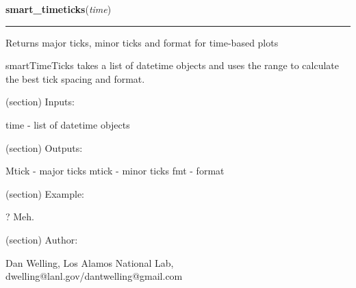     \label{spacepy:toolbox:smartTimeTicks}

    \vspace{0.5ex}

\hspace{.8\funcindent}\begin{boxedminipage}{\funcwidth}

    \raggedright \textbf{smart\_timeticks}(\textit{time})

    \vspace{-1.5ex}

    \rule{\textwidth}{0.5\fboxrule}
\setlength{\parskip}{2ex}
    Returns major ticks, minor ticks and format for time-based plots

    smartTimeTicks takes a list of datetime objects and uses the range to 
    calculate the best tick spacing and format.

    (section) Inputs:

      time - list of datetime objects

    (section) Outputs:

      Mtick - major ticks mtick - minor ticks fmt - format

    (section) Example:

      ? Meh.

    (section) Author:

      Dan Welling, Los Alamos National Lab, 
      dwelling@lanl.gov/dantwelling@gmail.com

\setlength{\parskip}{1ex}
    \end{boxedminipage}

    \label{spacepy:toolbox:logspace}

    \vspace{0.5ex}

